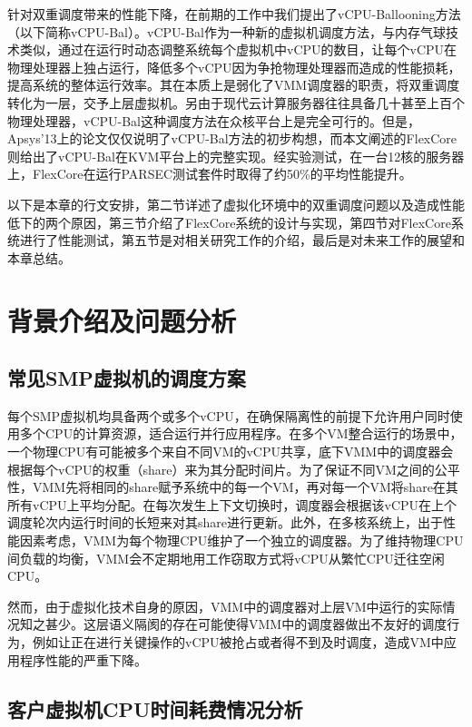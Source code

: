 针对双重调度带来的性能下降，在前期的工作中我们提出了vCPU-Ballooning方法（以下简称vCPU-Bal）\cite{song2013schedule}。vCPU-Bal作为一种新的虚拟机调度方法，与内存气球技术类似\cite{waldspurger2002memory}，通过在运行时动态调整系统每个虚拟机中vCPU的数目，让每个vCPU在物理处理器上独占运行，降低多个vCPU因为争抢物理处理器而造成的性能损耗，提高系统的整体运行效率。其在本质上是弱化了VMM调度器的职责，将双重调度转化为一层，交予上层虚拟机。另由于现代云计算服务器往往具备几十甚至上百个物理处理器，vCPU-Bal这种调度方法在众核平台上是完全可行的。但是，Apsys'13上的论文仅仅说明了vCPU-Bal方法的初步构想，而本文阐述的FlexCore则给出了vCPU-Bal在KVM平台上的完整实现。经实验测试，在一台12核的服务器上，FlexCore在运行PARSEC测试套件时取得了约50\%的平均性能提升。

以下是本章的行文安排，第二节详述了虚拟化环境中的双重调度问题以及造成性能低下的两个原因，第三节介绍了FlexCore系统的设计与实现，第四节对FlexCore系统进行了性能测试，第五节是对相关研究工作的介绍，最后是对未来工作的展望和本章总结。



\section{背景介绍及问题分析}

\subsection{常见SMP虚拟机的调度方案}

每个SMP虚拟机均具备两个或多个vCPU，在确保隔离性的前提下允许用户同时使用多个CPU的计算资源，适合运行并行应用程序。在多个VM整合运行的场景中，一个物理CPU有可能被多个来自不同VM的vCPU共享，底下VMM中的调度器会根据每个vCPU的权重（share）来为其分配时间片。为了保证不同VM之间的公平性，VMM先将相同的share赋予系统中的每一个VM，再对每一个VM将share在其所有vCPU上平均分配。在每次发生上下文切换时，调度器会根据该vCPU在上个调度轮次内运行时间的长短来对其share进行更新。此外，在多核系统上，出于性能因素考虑，VMM为每个物理CPU维护了一个独立的调度器。为了维持物理CPU间负载的均衡，VMM会不定期地用工作窃取方式将vCPU从繁忙CPU迁往空闲CPU\cite{vsphere41}。

然而，由于虚拟化技术自身的原因，VMM中的调度器对上层VM中运行的实际情况知之甚少。这层语义隔阂\cite{chen2001virtual}的存在可能使得VMM中的调度器做出不友好的调度行为，例如让正在进行关键操作的vCPU被抢占或者得不到及时调度，造成VM中应用程序性能的严重下降。

\subsection{客户虚拟机CPU时间耗费情况分析}

